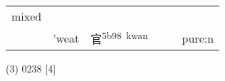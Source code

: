 \documentclass[14pt,a4paper]{scrartcl}
\begin{document}
\begin{longtable}[c]{@{}llllll@{}}
\begin{minipage}[t]{0.14\columnwidth}\raggedright\strut
mixed
\strut\end{minipage}\tabularnewline
\begin{minipage}[t]{0.14\columnwidth}\raggedright\strut
𡧺
\strut\end{minipage} &
\begin{minipage}[t]{0.14\columnwidth}\raggedright\strut
'weat
\strut\end{minipage} &
\begin{minipage}[t]{0.14\columnwidth}\raggedright\strut
官\textsuperscript{5b98~kwan}
\strut\end{minipage} &
\begin{minipage}[t]{0.14\columnwidth}\raggedright\strut
\strut\end{minipage} &
\begin{minipage}[t]{0.14\columnwidth}\raggedright\strut
\strut\end{minipage} &
\begin{minipage}[t]{0.14\columnwidth}\raggedright\strut
pure:n
\strut\end{minipage}\tabularnewline
\bottomrule
\end{longtable}

(3) 0238 {[}4{]}
\end{document}
